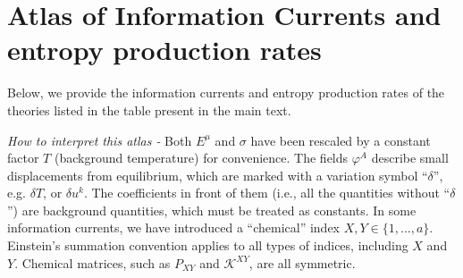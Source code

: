 \documentclass[aps,prl,singlecolumn,nofootinbib]{revtex4-2}
\theoremstyle{definition}
\theoremstyle{theorem}
\begin{document}
\newpage

\section{Atlas of Information Currents and entropy production rates}

Below, we provide the information currents and entropy production rates of the theories listed in the table present in the main text.

\noindent \textit{How to interpret this atlas -} Both $E^\mu$ and $\sigma$ have been rescaled by a constant factor $T$ (background temperature) for convenience. The fields $\varphi^A$ describe small displacements from equilibrium, which are marked with a variation symbol ``$\delta$'', e.g. $\delta T$, or $\delta u^k$.  The coefficients in front of them (i.e., all the quantities without ``$\delta$'') are background quantities, which must be treated as constants. In some information currents, we have introduced a ``chemical'' index $X,Y \in \{1,...,a\}$. Einstein's summation convention applies to all types of indices, including $X$ and $Y$. Chemical matrices, such as $P_{XY}$ and $\mathcal{K}^{XY}$, are all symmetric. 
\end{document}

